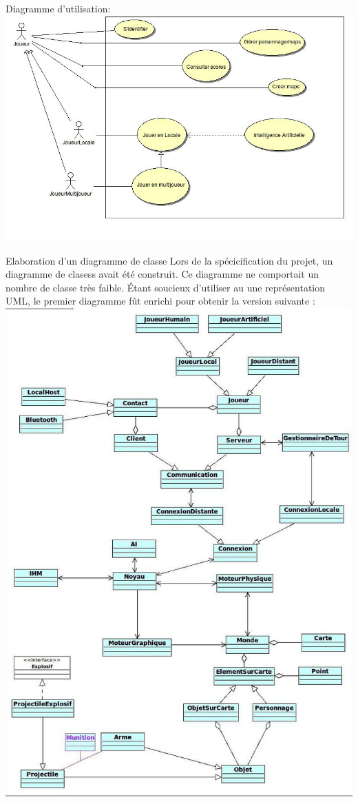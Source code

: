 \documentclass{report}
\begin{document}
Diagramme d’utilisation: \\
\includegraphics[scale=0.5]{images/graph3}

Elaboration d’un diagramme de classe
Lors de la spécicification du projet, un diagramme de clasess avait été construit. Ce diagramme ne comportait un nombre de classe très faible. Étant soucieux d’utiliser au une représentation UML, le premier diagramme fût enrichi pour obtenir la version suivante :\\

\includegraphics[scale=0.5]{images/graph4}
\bigskip
\end{document}
